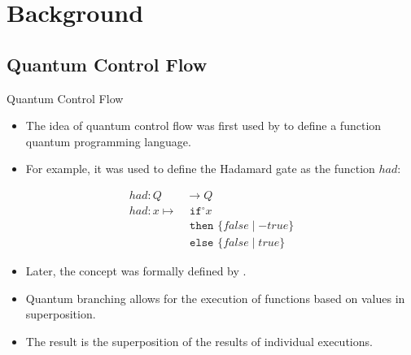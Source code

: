 \section{Background}
\subsection{Quantum Control Flow}
\begin{frame}{Quantum Control Flow}
    
    \begin{itemize}
        \item The idea of quantum control flow was first used by \cite{AlGr05} to define a function quantum programming language.
        \item For example, it was used to define the Hadamard gate as the function $had$:  
    \end{itemize}
    \begin{align*}
        had : Q& \to Q\\
        had : x \mapsto& \texttt{ if}^\circ x\\
                       & \texttt{ then } \{false \mid -true\}\\
                       & \texttt{ else } \{false \mid true\}
    \end{align*}
    \begin{itemize}
        \item Later, the concept was formally defined by \cite{YYF12}.
        \item Quantum branching allows for the execution of functions based on values in superposition.
        \item The result is the superposition of the results of individual executions.
    \end{itemize}
\end{frame}
